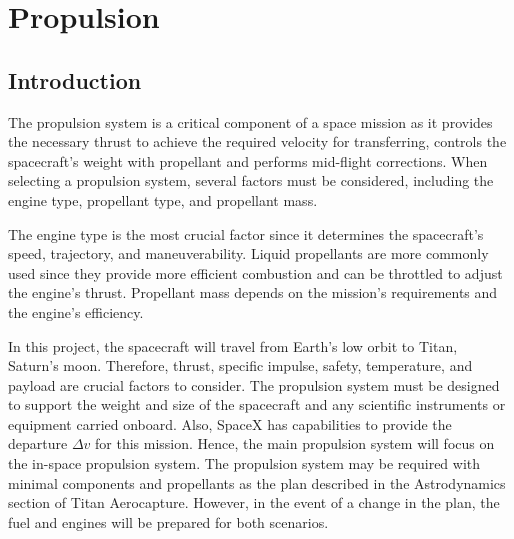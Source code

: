 \documentclass[conf]{new-aiaa}
\begin{document}
\section{Propulsion}
\subsection{Introduction}
\par The propulsion system is a critical component of a space mission as it provides the necessary thrust to achieve the required velocity for transferring, controls the spacecraft's weight with propellant and performs mid-flight corrections. When selecting a propulsion system, several factors must be considered, including the engine type, propellant type, and propellant mass.\\
\par The engine type is the most crucial factor since it determines the spacecraft's speed, trajectory, and maneuverability. Liquid propellants are more commonly used since they provide more efficient combustion and can be throttled to adjust the engine's thrust. Propellant mass depends on the mission's requirements and the engine's efficiency.\\
\par In this project, the spacecraft will travel from Earth's low orbit to Titan, Saturn's moon. Therefore, thrust, specific impulse, safety, temperature, and payload are crucial factors to consider. The propulsion system must be designed to support the weight and size of the spacecraft and any scientific instruments or equipment carried onboard. Also, SpaceX has capabilities to provide the departure $\Delta v$ for this mission\cite{taylor_2015}. Hence, the main propulsion system will focus on the in-space propulsion system. The propulsion system may be required with minimal components and propellants as the plan described in the Astrodynamics section of Titan Aerocapture. However, in the event of a change in the plan, the fuel and engines will be prepared for both scenarios.
\end{document}
